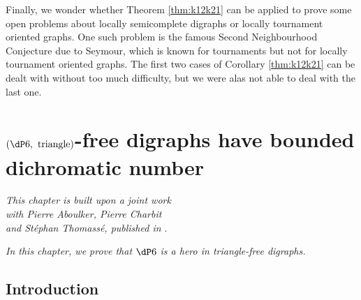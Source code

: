 Finally, we wonder whether Theorem \ref{thm:k12k21} can be applied to prove some open problems about locally semicomplete digraphs or locally tournament oriented graphs. One such problem is the famous Second Neighbourhood Conjecture due to Seymour, which is known for tournaments but not for locally tournament oriented graphs. The first two cases of Corollary \ref{thm:k12k21} can be dealt with without too much difficulty, but we were alas not able to deal with the last one.
\medskip 


\chapter{$(\dP6, \text{ triangle})$-free digraphs have bounded dichromatic number}\label{chpt:psix}

\begin{flushright}{\slshape    
This chapter is built upon a joint work \\
with Pierre Aboulker, Pierre Charbit \\
and Stéphan Thomassé, published in \cite{AACT22}}. \\ \medskip
\end{flushright}

\emph{In this chapter, we prove that $\dP6$ is a hero in triangle-free digraphs.}

\section{Introduction}






